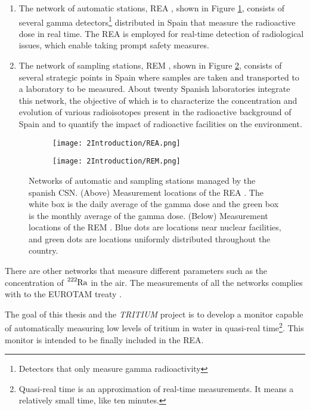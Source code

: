 \begin{enumerate}
\begin{enumerate}
\item{} The network of automatic stations, REA \cite{REA}, shown in Figure \ref{subfig:REA}, consists of several gamma detectors\footnote{Detectors that only measure gamma radioactivity} distributed in Spain that measure the radioactive dose in real time. The REA is employed for real-time detection of radiological issues, which enable taking prompt safety measures.

\item{} The network of sampling stations, REM \cite{REM}, shown in Figure \ref{subfig:REM}, consists of several strategic points in Spain where samples are taken and transported to a laboratory to be measured. About twenty Spanish laboratories integrate this network, the objective of which is to characterize the concentration and evolution of various radioisotopes present in the radioactive background of Spain and to quantify the impact of radioactive facilities on the environment.
\end{enumerate}

\begin{figure}
\centering
    \begin{subfigure}[b]{0.7\textwidth}
    \centering
    \texttt{[image: 2Introduction/REA.png]}  
        \caption{}\label{subfig:REA}
    \end{subfigure}
    \hfill
    \begin{subfigure}[b]{0.7\textwidth}
    \centering
    \texttt{[image: 2Introduction/REM.png]}  
    \caption{\label{subfig:REM}}
    \end{subfigure}
 \caption{Networks of automatic and sampling stations managed by the spanish CSN. (Above) Measurement locations of the REA \cite{REA}. The white box is the daily average of the gamma dose and the green box is the monthly average of the gamma dose. (Below) Measurement locations of the REM \cite{REM}. Blue dots are locations near nuclear facilities, and green dots are locations uniformly distributed throughout the country.}
 \label{fig:NetworksCSN}
\end{figure}

There are other networks that measure different parameters such as the concentration of $\ce{^{222}Ra}$ in the air. The measurements of all the networks complies with to the EUROTAM treaty \cite{100BqL}.
\end{enumerate}

The goal of this thesis and the \textit{TRITIUM} project is to develop a monitor capable of automatically measuring low levels of tritium in water in quasi-real time\footnote{Quasi-real time is an approximation of real-time measurements. It means a relatively small time, like ten minutes.}. This monitor is intended to be finally included in the REA.

